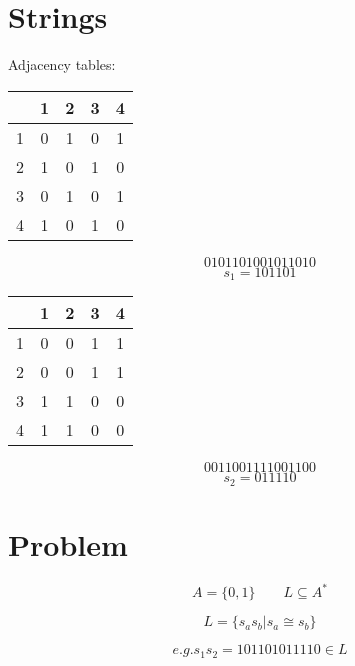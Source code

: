 \documentclass[a4paper]{IEEEtran}
\begin{document}
\section{Strings}
    \vspace{2mm}
    Adjacency tables:
    \begin{center}
        \begin{minipage}{0.45\columnwidth}
        \centering
        \begin{tabular}{ c|cccc }
              & 1 & 2 & 3 & 4 \\
            \hline
            1 & 0 & 1 & 0 & 1 \\
            2 & 1 & 0 & 1 & 0 \\
            3 & 0 & 1 & 0 & 1 \\
            4 & 1 & 0 & 1 & 0 \\
        \end{tabular}
        \vspace{2mm}
        \[0101 1010 0101 1010\]
        \[s_1 = 101 10 1 \]
        \end{minipage}
        \begin{minipage}{0.45\columnwidth}
        \begin{tabular}{ c|cccc }
               & 1 & 2 & 3 & 4 \\
             \hline
             1 & 0 & 0 & 1 & 1 \\
             2 & 0 & 0 & 1 & 1 \\
             3 & 1 & 1 & 0 & 0 \\
             4 & 1 & 1 & 0 & 0 \\
        \end{tabular}
        \vspace{2mm}
        \[0011 0011 1100 1100\]
        \[s_2 = 011 11 0 \]
        \end{minipage}
    \end{center}
    \vspace{4mm}

\section{Problem}

    \[A = \{0,1\} \qquad L \subseteq A^*\]

    \[L = \{ s_as_b | s_a \cong s_b \} \]

    \[ e.g. s_1 s_2 = 101 10 1 011 11 0 \in L \]
\end{document}

